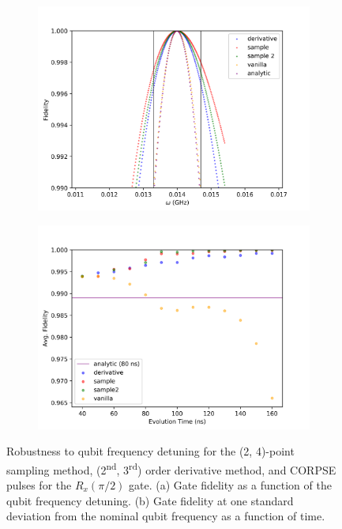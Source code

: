 \documentclass[
  amsfonts,
  amsmath,
  tbtags,
  amssymb,
  aps,
  nobibnotes,
  twocolumn,
]{revtex4-2}
\begin{document}
\begin{figure}
  \begin{subfigure}{\linewidth}
    \label{fig:5.1:a}
    \includegraphics[width=\linewidth]{assets/00005_spin12_hpsweep.png}
  \end{subfigure}
  
  \begin{subfigure}{\linewidth}
    \includegraphics[width=\linewidth]{assets/00006_spin12_hpsweep.png}
    \label{fig:5.1:a}
  \end{subfigure}
  \caption{\centering Robustness to qubit frequency detuning for
    the (2, 4)-point sampling method, (2\textsuperscript{nd}, 3\textsuperscript{rd})
    order derivative method, and CORPSE pulses for the $R_{x}(\pi/2)$ gate.
    (a) Gate fidelity as a function of the qubit frequency detuning.
    (b) Gate fidelity at one standard deviation from the nominal qubit frequency
    as a function of time.
  }
\end{figure}
\end{document}
